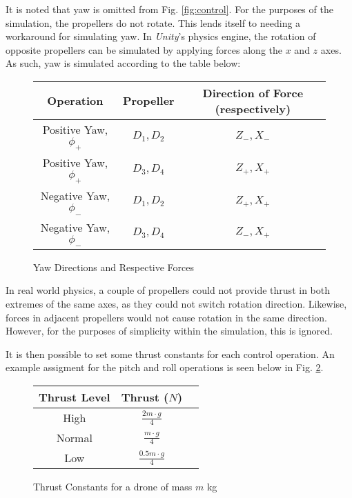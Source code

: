 \documentclass[../report.tex]{subfiles}
\begin{document}
It is noted that yaw is omitted from Fig. \ref{fig:control}. For the purposes of the simulation, the propellers do not rotate. This lends itself to needing a workaround for simulating yaw. In \emph{Unity}'s physics engine, the rotation of opposite propellers can be simulated by applying forces along the $x$ and $z$ axes. As such, yaw is simulated according to the table below:

\begin{figure}[H]
    \begin{center}
    \begin{tabular}{| c | c | c |} 
    \hline
    Operation & Propeller & Direction of Force (respectively) \\ 
    \hline
    Positive Yaw, $\phi_+$ & $D_1, D_2$ & $Z_-, X_-$ \\
    \hline
    Positive Yaw, $\phi_+$ & $D_3, D_4$ & $Z_+, X_+$ \\
    \hline
    Negative Yaw, $\phi_-$ & $D_1, D_2$ & $Z_+, X_+$ \\
    \hline
    Negative Yaw, $\phi_-$ & $D_3, D_4$ & $Z_-, X_+$ \\
    \hline
    \end{tabular}
    \end{center}
    \caption{Yaw Directions and Respective Forces}
    \label{fig:yaw-control}
\end{figure}

In real world physics, a couple of propellers could not provide thrust in both extremes of the same axes, as they could not switch rotation direction. Likewise, forces in adjacent propellers would not cause rotation in the same direction. However, for the purposes of simplicity within the simulation, this is ignored.

It is then possible to set some thrust constants for each control operation. An example assigment for the pitch and roll operations is seen below in Fig. \ref{fig:thrust-constants}.

\begin{figure}[H]
    \begin{center}
    \begin{tabular}{| c | c | c |} 
    \hline
    Thrust Level & Thrust ($N$) \\ 
    \hline
    High & $\frac{2m \cdot g}{4}$\\
    \hline
    Normal & $\frac{m \cdot g}{4}$\\
    \hline
    Low & $\frac{0.5m \cdot g}{4}$\\
    \hline
    \end{tabular}
    \end{center}
    \caption{Thrust Constants for a drone of mass $m$ kg}
    \label{fig:thrust-constants}
\end{figure}
\end{document}
